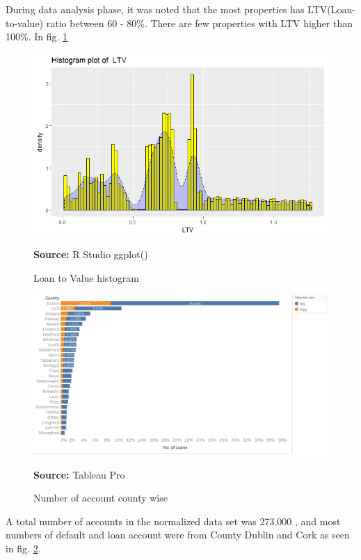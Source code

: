 During data analysis phase, it was noted that the most properties has LTV(Loan-to-value) ratio between 60 - 80\%. There are few properties with LTV higher than 100\%.
In fig. \ref{fig:ltv}
\begin{center}
\begin{figure}[!htb]
\includegraphics[scale=0.5]{ltv.png}
\centering
\caption{Loan to Value histogram}{\textbf{Source:} R Studio ggplot()}
\label{fig:ltv}
\end{figure}
\end{center}

\begin{center}
\begin{figure}[!htb]
\includegraphics[scale=.4]{countynumber.png}
\centering
\caption{Number of account county wise}{\textbf{Source:} Tableau Pro}
\label{fig:tableaucounty}
\end{figure}
\end{center}

A total number of accounts in the normalized data set was 273,000 , and most numbers of default and loan account were from County Dublin and Cork as seen in fig. \ref{fig:tableaucounty}.

